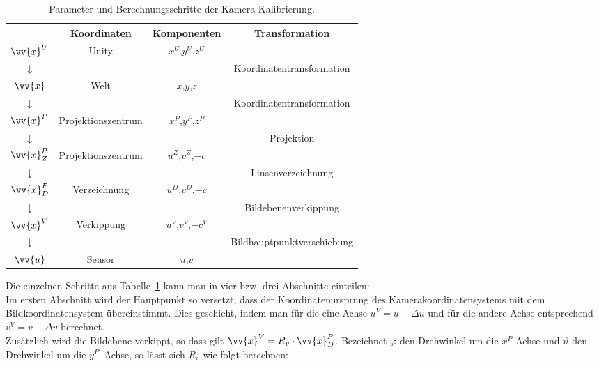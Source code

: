 \begin{table}
	\centering
	\renewcommand{\arraystretch}{1.4}
	\begin{tabular}{|c|c|c|c|}
		\hline
		\Absatzbox{}
		& \textbf{Koordinaten} & \textbf{Komponenten}&\textbf{Transformation}\\
		\hline
		$\vv{x}^U$ & Unity &$x^U$,$y^U$,$z^U$& \\
		\cline{2-4}
		$\downarrow$ & & & Koordinatentransformation\\
		\cline{2-4}
		$\vv{x}$ & Welt &$x$,$y$,$z$&  \\
		\cline{2-4}
		$\downarrow$ & & & Koordinatentransformation\\
		\cline{2-4}
		$\vv{x}^P$ & Projektionszentrum &$x^P$,$y^P$,$z^P$& \\
		\cline{2-4}
		$\downarrow$ & & & Projektion \\
		\cline{2-4}
		$\vv{x}^P_Z$ & Projektionszentrum &$u^Z$,$v^Z$,$-c$& \\
		\cline{2-4}
		$\downarrow$ & & & Linsenverzeichnung\\
		\cline{2-4}	
		$\vv{x}^P_D$ & Verzeichnung &$u^D$,$v^D$,$-c$& \\
		\cline{2-4}
		$\downarrow$ & & & Bildebenenverkippung\\
		\cline{2-4}		
		$\vv{x}^V$ &Verkippung &$u^V$,$v^V$,$-c^V$& \\
		\cline{2-4}
		$\downarrow$ & & & Bildhauptpunktverschiebung\\
		\cline{2-4}	
		$\vv{u}$ & Sensor &$u$,$v$ & \\
		\hline
	\end{tabular}
	\caption{Parameter und Berechnungsschritte der Kamera Kalibrierung.\cite{Meisel:77890}}
	\label{tab:camCalibParam}
\end{table}

Die einzelnen Schritte aus Tabelle~\ref{tab:camCalibParam} kann man in vier bzw. drei Abschnitte einteilen: \\
Im ersten Abschnitt wird der Hauptpunkt so versetzt, dass der Koordinatenursprung des Kamerakoordinatensystems mit dem Bildkoordinatensystem übereinstimmt. Dies geschieht, indem man für die eine Achse $u^V = u - \Delta u$ und für die andere Achse entsprechend $v^V = v - \Delta v$ berechnet.\\
Zusätzlich wird die Bildebene verkippt, so dass gilt $\vv{x}^V = R_v \cdot \vv{x}^P_D$. Bezeichnet $\varphi$ den Drehwinkel um die $x^P$-Achse und $\vartheta$ den Drehwinkel um die $y^{P'}$-Achse, so lässt sich $R_v$ wie folgt berechnen:

